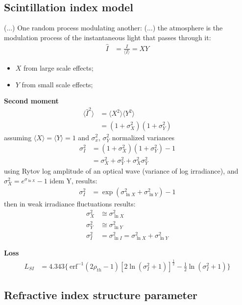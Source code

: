 \documentclass[a4paper]{article}
\begin{document}
\subsection{Scintillation index model}
(...) One random process modulating another: (...) the atmosphere is the modulation process of the instantaneous light that passes through it:
\begin{align*}
\hat{I} &= \frac{I}{\langle I \rangle} = XY
\end{align*}
\begin{itemize}
\item $X$ from large scale effects;
\item $Y$ from small scale effects;
\end{itemize}
\textbf{Second moment}
\begin{align*}
\langle \hat{I}^2 \rangle &= \langle X^2 \rangle\langle Y^2 \rangle\\
	&= (1+\sigma_X^2)(1+\sigma_Y^2)
\end{align*}
assuming $\langle X \rangle=\langle Y \rangle=1$ and $\sigma_x^2$, $\sigma_Y^2$ normalized variances
\begin{align*}
\sigma_I^2 &= (1+\sigma_X^2)(1+\sigma_Y^2)-1\\
&= \sigma_X^2+\sigma_Y^2+\sigma_X^2\sigma_Y^2
\end{align*}
using Rytov log amplitude of an optical wave (variance of log irradiance), and $\sigma^2_X=e^{\sigma_{\ln X}}-1$ idem Y, results:
\begin{align*}
\sigma_I^2 &= \exp(\sigma^2_{\ln X}+\sigma^2_{\ln Y})-1
\end{align*}
then in weak irradiance fluctuations results:
\begin{align*}
\sigma_X^2 &\cong \sigma^2_{\ln X}\\
\sigma_Y^2 &\cong \sigma^2_{\ln Y}\\
\sigma_I^2 &= \sigma^2_{\ln I} = \sigma^2_{\ln X}+\sigma^2_{\ln Y}
\end{align*}

\textbf{Loss}
\begin{align*}
L_{SI} &= 4.343\{\ \textrm{erf}^{-1} (2\rho_{th}-1)\left[ 2\ln(\sigma_I^2+1)\right]^{\frac{1}{2}} - \frac{1}{2}\ln (\sigma_I^2 + 1) \}
\end{align*}


\subsection{Refractive index structure parameter}
\end{document}
